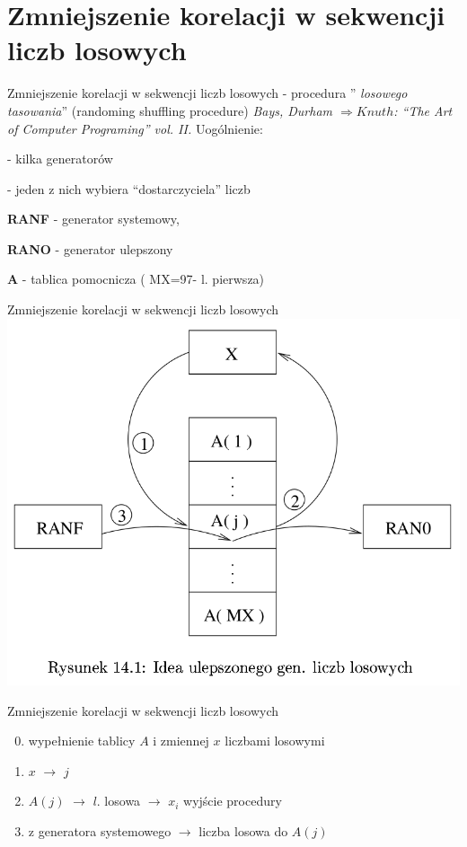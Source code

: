 \section{Zmniejszenie korelacji w sekwencji liczb losowych}
	\begin{frame}{Zmniejszenie korelacji w sekwencji liczb losowych}
	- procedura '' {\it losowego tasowania}'' (randoming shuffling procedure) {\it Bays, Durham 	$\Rightarrow Knuth$: ``The Art of Computer 	Programing'' vol. II.} 
	\newline \newline
	Uogólnienie:

	- kilka generatorów

	- jeden z nich wybiera ``dostarczyciela'' liczb

	\textbf{RANF} - generator systemowy,

	\textbf{RANO} - generator ulepszony

	\textbf{A} - tablica pomocnicza ( MX=97- l. pierwsza)

	\end{frame}
    
	\begin{frame}{Zmniejszenie korelacji w sekwencji liczb losowych}
		\centering \includegraphics[width=.8\linewidth]{img/14/14_5_1_img.png}
	\end{frame}

	\begin{frame}{Zmniejszenie korelacji w sekwencji liczb losowych}
		\begin{enumerate}
			\setcounter{enumi}{-1}
			\item wypełnienie tablicy $A$ i zmiennej $x$ liczbami losowymi
			\item $x$ $\rightarrow$ $j$
			\item $A(j)$ $\rightarrow$ $l$. losowa $\rightarrow$ $x_{i}$ wyjście procedury
			\item z generatora systemowego $\rightarrow$ liczba losowa do $A(j)$
		\end{enumerate}
	\end{frame}

